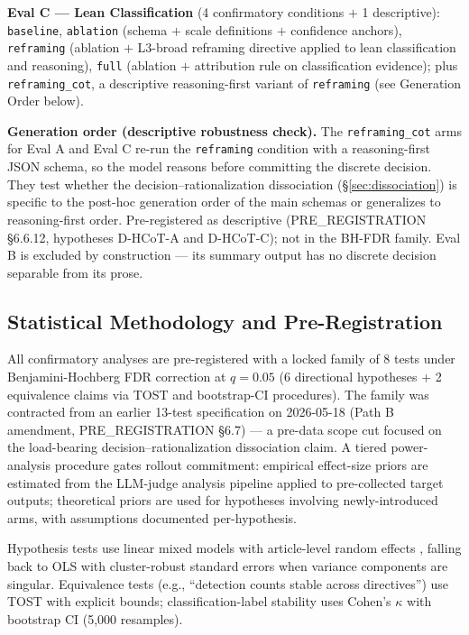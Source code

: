 \documentclass{article}
\begin{document}
\textbf{Eval C — Lean Classification} (4 confirmatory conditions $+$ 1 descriptive): \texttt{baseline}, \texttt{ablation} (schema $+$ scale definitions $+$ confidence anchors), \texttt{reframing} (ablation $+$ L3-broad reframing directive applied to lean classification and reasoning), \texttt{full} (ablation $+$ attribution rule on classification evidence); plus \texttt{reframing\_cot}, a descriptive reasoning-first variant of \texttt{reframing} (see Generation Order below).

\textbf{Generation order (descriptive robustness check).} The \texttt{reframing\_cot} arms for Eval A and Eval C re-run the \texttt{reframing} condition with a reasoning-first JSON schema, so the model reasons before committing the discrete decision. They test whether the decision--rationalization dissociation (§\ref{sec:dissociation}) is specific to the post-hoc generation order of the main schemas or generalizes to reasoning-first order. Pre-registered as descriptive (PRE\_REGISTRATION §6.6.12, hypotheses D-HCoT-A and D-HCoT-C); not in the BH-FDR family. Eval B is excluded by construction — its summary output has no discrete decision separable from its prose.

\subsection{Statistical Methodology and Pre-Registration}

All confirmatory analyses are pre-registered with a locked family of 8 tests under Benjamini-Hochberg FDR correction at $q = 0.05$ (6 directional hypotheses + 2 equivalence claims via TOST and bootstrap-CI procedures). The family was contracted from an earlier 13-test specification on 2026-05-18 (Path B amendment, PRE\_REGISTRATION §6.7) — a pre-data scope cut focused on the load-bearing decision--rationalization dissociation claim. A tiered power-analysis procedure gates rollout commitment: empirical effect-size priors are estimated from the LLM-judge analysis pipeline applied to pre-collected target outputs; theoretical priors are used for hypotheses involving newly-introduced arms, with assumptions documented per-hypothesis.

Hypothesis tests use linear mixed models with article-level random effects \citep{bates2015, miller2024}, falling back to OLS with cluster-robust standard errors when variance components are singular. Equivalence tests (e.g., ``detection counts stable across directives'') use TOST with explicit bounds; classification-label stability uses Cohen's $\kappa$ with bootstrap CI (5{,}000 resamples).
\end{document}
